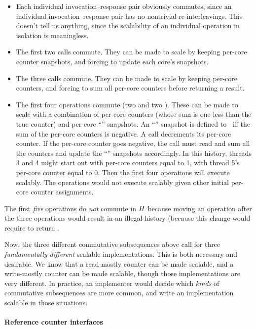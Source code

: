 \begin{itemize}
\item Each individual invocation--response pair obviously commutes, since an
  individual invocation--response pair has no nontrivial re-interleavings.
  This doesn't tell us anything, since the scalability of an
  individual operation in isolation is meaningless.
\item The first two  calls commute. They can be made to scale
  by keeping per-core counter snapshots, and forcing  to update
  each core's snapshots.
\item The three  calls commute. They can be made to scale by
  keeping per-core counters, and forcing  to sum all per-core
  counters before returning a result.
\item The first four operations commute (two  and two ). These can be
  made to scale with a combination of per-core counters (whose sum is one
  less than the true counter) and
  per-core ``'' snapshots. An ``'' snapshot is defined to
  \TRUE\ iff the sum of the per-core counters is negative. A 
  call decrements its per-core counter. If the per-core counter goes
  negative, the  call must read and sum all the counters and update
  the ``'' snapshots accordingly.
  In this history, threads 3 and 4 might start out with per-core
  counters equal to 1, with thread 5's per-core counter equal to 0.
  Then the first four operations will execute scalably.
  The operations would not execute scalably given other
  initial per-core counter assignments.
\end{itemize}

The first \emph{five} operations do \emph{not} commute in $H$
because moving an  operation after the three 
operations would result in an illegal history (because this change would
require  to return \TRUE.

Now, the three different commutative subsequences above call for three
\emph{fundamentally different} scalable implementations.  This is both
necessary and desirable.
We know that a read-mostly counter can be made scalable, and a
write-mostly counter can be made scalable, though those implementations
are very different. In practice, an implementer would decide which
\emph{kinds} of commutative subsequences are more common, and write an
implementation scalable in those situations.


\paragraph{Reference counter interfaces}

